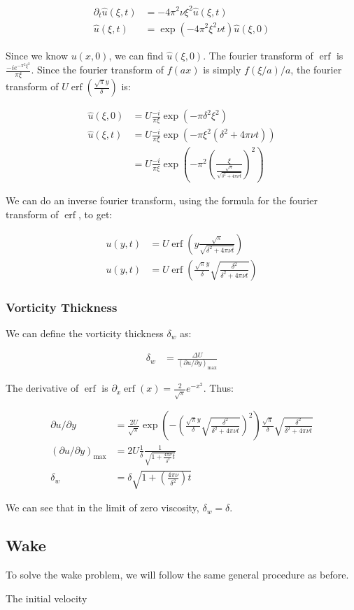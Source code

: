 \documentclass{article}
\DeclareMathOperator\erf{erf}
\begin{document}
\begin{align}
\partial_t \hat{u}(\xi, t) & = - 4 \pi^2 \nu \xi^2 \hat{u}(\xi, t) \\
\hat{u}(\xi, t) & = \exp \left( - 4 \pi^2 \xi^2 \nu t \right) \hat{u}(\xi, 0)
\end{align}

Since we know $u(x,0)$, we can find $\hat{u}(\xi, 0)$.
The fourier transform of $\erf$ is $\frac{- i e^{-\pi^2 \xi^2}}{\pi \xi}$.
Since the fourier transform of $f(a x)$ is simply $f(\xi/a)/a$,
	the fourier transform of $U \erf \left( 
	\frac{ \sqrt{\pi} y}{\delta } \right)$ is:

\begin{align}
\hat{u}(\xi, 0) & = U
	\frac{- i }{\pi \xi}\exp \left(-\pi \delta^2 \xi^2\right) \\
\hat{u}(\xi, t) & = U \frac{- i}{\pi \xi} 
	\exp\left(- \pi \xi^2 \left( \delta^2 + 4 \pi \nu t \right) \right)\\
& = U \frac{- i}{\pi \xi} 
	\exp\left(- \pi^2 \left( \frac{\xi}{\frac{\sqrt{\pi}}{
	\sqrt{\delta^2 + 4 \pi \nu t}}} \right)^2 \right) \nonumber
\end{align}

We can do an inverse fourier transform, using the formula for the fourier
	transform of $\erf$, to get:

\begin{align}
u(y,t) & = U \erf \left( y \frac{\sqrt{\pi}}
	{\sqrt{\delta^2 + 4 \pi \nu t}} \right) \nonumber \\
u(y,t) & = U \erf \left( \frac{ \sqrt{\pi} y}{\delta} 
	\sqrt{ \frac{\delta^2}{\delta^2 + 4 \pi \nu t}} \right) 
\end{align}

\subsubsection{Vorticity Thickness}

We can define the vorticity thickness $\delta_w$ as:

\begin{align}
\delta_w & = \frac{\Delta U}{\left( \partial u / \partial y \right)_\text{max}}
\end{align}

The derivative of $\erf$ is $\partial_x \erf(x) 
	= \frac{2}{\sqrt{\pi}} e^{-x^2}$.
Thus:

\begin{align}
\partial u / \partial y & = \frac{2 U}{\sqrt{\pi}} 
	\exp \left( - \left( \frac{ \sqrt{\pi} y}{\delta} 
	\sqrt{ \frac{\delta^2}{\delta^2 + 4 \pi \nu t}} \right)^2 \right) 
	\frac{ \sqrt{\pi}}{\delta} 
	\sqrt{ \frac{\delta^2}{\delta^2 + 4 \pi \nu t}} \nonumber \\
\left( \partial u / \partial y \right)_\text{max} & =
	2 U \frac{1}{\delta} \frac{1}{\sqrt{1 + \frac{4 \pi \nu}{\delta^2} t}}\\
\delta_w & = \delta \sqrt{ 1 + \left( \frac{4 \pi \nu}{\delta^2} \right) t } 
\end{align}

We can see that in the limit of zero viscosity, $\delta_w = \delta$.

\subsection{Wake}

To solve the wake problem, we will follow the same general procedure
	as before.

The initial velocity
\end{document}
